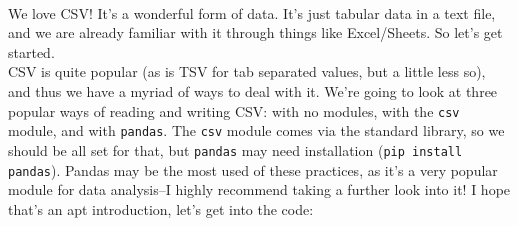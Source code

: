 \documentclass[12pt]{article}
\begin{document}
\\

We love CSV! It's a wonderful form of data. It's just tabular data in a text file, and we are already familiar with it through things like Excel/Sheets. So let's get started.\\
CSV is quite popular (as is TSV for tab separated values, but a little less so), and thus we have a myriad of ways to deal with it. We're going to look at three popular ways of reading and writing CSV: with no modules, with the \texttt{csv} module, and with \texttt{pandas}. The \texttt{csv} module comes via the standard library, so we should be all set for that, but \texttt{pandas} may need installation (\texttt{pip install pandas}). Pandas may be the most used of these practices, as it's a very popular module for data analysis--I highly recommend taking a further look into it! I hope that's an apt introduction, let's get into the code:\\
\end{document}
